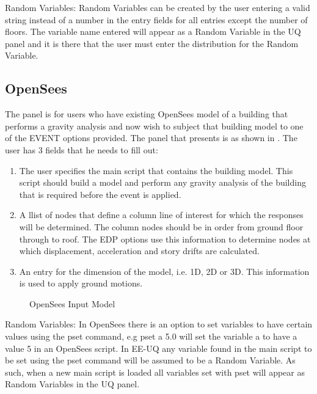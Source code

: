 Random Variables: Random Variables can be created by the user entering
a valid string instead of a number in the entry fields for all entries
except the number of floors. The variable name entered will appear as
a Random Variable in the UQ panel and it is there that the user must
enter the distribution for the Random Variable.


\subsection{OpenSees}
The panel is for users who have existing OpenSees model of a building
that performs a gravity analysis and now wish to subject that building
model to one of the EVENT options provided. The panel that presents is
as shown in . The user has 3 fields that he needs
to fill out:
\begin{enumerate} 
\item The user specifies the main script that contains the building
  model. This script should build a model and perform any gravity
  analysis of the building that is required before the event is
  applied.
\item A llist of nodes that define a column line of interest for which
  the responses will be determined. The column nodes should be in
  order from ground floor through to roof. The EDP options use this
  information to determine nodes at which displacement, acceleration
  and story drifts are calculated.
\item An entry for the dimension of the model, i.e. 1D, 2D or 3D. This
  information is used to apply ground motions.
\end{enumerate}

\begin{figure}[!htbp]
  \caption{OpenSees Input Model}
  \label{fig:figure3}
\end{figure}

Random Variables: In OpenSees there is an option to set variables to
have certain values using the pset command, e.g pset a 5.0 will set
the variable a to have a value 5 in an OpenSees script. In EE-UQ any
variable found in the main script to be set using the pset command
will be assumed to be a Random Variable. As such, when a new main
script is loaded all variables set with pset will appear as Random
Variables in the UQ panel.

